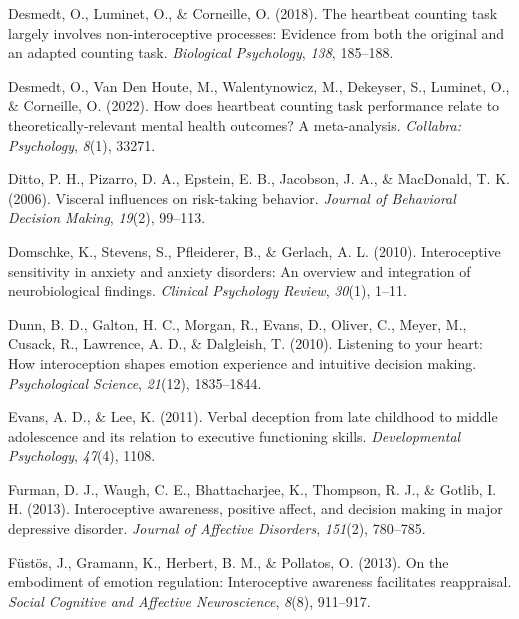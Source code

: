 \documentclass[
  man,mask,floatsintext]{apa6}
\newlength{\cslhangindent}
\newlength{\cslentryspacingunit} %
\newenvironment{CSLReferences}[2] %
 {%
  \setlength{\parindent}{0pt}
  \ifodd #1
  \let\oldpar\par
  \def\par{\hangindent=\cslhangindent\oldpar}
  \fi
  \setlength{\parskip}{#2\cslentryspacingunit}
 }%
 {}
\begin{document}
\begin{CSLReferences}{1}{0}
\leavevmode{}%
Desmedt, O., Luminet, O., \& Corneille, O. (2018). The heartbeat counting task largely involves non-interoceptive processes: Evidence from both the original and an adapted counting task. \emph{Biological Psychology}, \emph{138}, 185--188.

\leavevmode{}%
Desmedt, O., Van Den Houte, M., Walentynowicz, M., Dekeyser, S., Luminet, O., \& Corneille, O. (2022). How does heartbeat counting task performance relate to theoretically-relevant mental health outcomes? A meta-analysis. \emph{Collabra: Psychology}, \emph{8}(1), 33271.

\leavevmode{}%
Ditto, P. H., Pizarro, D. A., Epstein, E. B., Jacobson, J. A., \& MacDonald, T. K. (2006). Visceral influences on risk-taking behavior. \emph{Journal of Behavioral Decision Making}, \emph{19}(2), 99--113.

\leavevmode{}%
Domschke, K., Stevens, S., Pfleiderer, B., \& Gerlach, A. L. (2010). Interoceptive sensitivity in anxiety and anxiety disorders: An overview and integration of neurobiological findings. \emph{Clinical Psychology Review}, \emph{30}(1), 1--11.

\leavevmode{}%
Dunn, B. D., Galton, H. C., Morgan, R., Evans, D., Oliver, C., Meyer, M., Cusack, R., Lawrence, A. D., \& Dalgleish, T. (2010). Listening to your heart: How interoception shapes emotion experience and intuitive decision making. \emph{Psychological Science}, \emph{21}(12), 1835--1844.

\leavevmode{}%
Evans, A. D., \& Lee, K. (2011). Verbal deception from late childhood to middle adolescence and its relation to executive functioning skills. \emph{Developmental Psychology}, \emph{47}(4), 1108.

\leavevmode{}%
Furman, D. J., Waugh, C. E., Bhattacharjee, K., Thompson, R. J., \& Gotlib, I. H. (2013). Interoceptive awareness, positive affect, and decision making in major depressive disorder. \emph{Journal of Affective Disorders}, \emph{151}(2), 780--785.

\leavevmode{}%
Füstös, J., Gramann, K., Herbert, B. M., \& Pollatos, O. (2013). On the embodiment of emotion regulation: Interoceptive awareness facilitates reappraisal. \emph{Social Cognitive and Affective Neuroscience}, \emph{8}(8), 911--917.


\end{CSLReferences}
\end{document}
